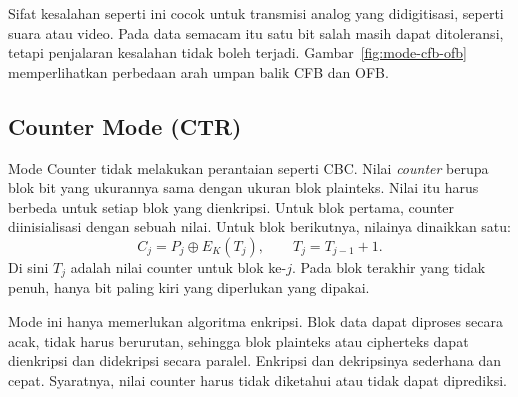 Sifat kesalahan seperti ini cocok untuk transmisi analog yang didigitisasi,
seperti suara atau video. Pada data semacam itu satu bit salah masih dapat
ditoleransi, tetapi penjalaran kesalahan tidak boleh terjadi.
Gambar~\ref{fig:mode-cfb-ofb} memperlihatkan perbedaan arah umpan balik CFB dan
OFB.



\subsection{Counter Mode (CTR)}

Mode Counter tidak melakukan perantaian seperti CBC. Nilai \textit{counter}
berupa blok bit yang ukurannya sama dengan ukuran blok plainteks. Nilai itu
harus berbeda untuk setiap blok yang dienkripsi. Untuk blok pertama, counter
diinisialisasi dengan sebuah nilai. Untuk blok berikutnya, nilainya dinaikkan
satu:
\begin{equation}
C_j = P_j \oplus E_K(T_j), \qquad T_j = T_{j-1} + 1.
\label{eq:ctr-enkripsi}
\end{equation}
Di sini $T_j$ adalah nilai counter untuk blok ke-$j$. Pada blok terakhir yang
tidak penuh, hanya bit paling kiri yang diperlukan yang dipakai.

Mode ini hanya memerlukan algoritma enkripsi. Blok data dapat diproses secara
acak, tidak harus berurutan, sehingga blok plainteks atau cipherteks dapat
dienkripsi dan didekripsi secara paralel. Enkripsi dan dekripsinya sederhana dan
cepat. Syaratnya, nilai counter harus tidak diketahui atau tidak dapat
diprediksi.


